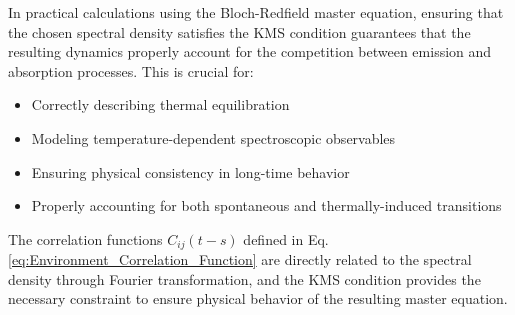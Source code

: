 \noindent In practical calculations using the Bloch-Redfield master equation, ensuring that the chosen spectral density satisfies the KMS condition guarantees that the resulting dynamics properly account for the competition between emission and absorption processes. This is crucial for:

\begin{itemize}
	\item Correctly describing thermal equilibration
	\item Modeling temperature-dependent spectroscopic observables
	\item Ensuring physical consistency in long-time behavior
	\item Properly accounting for both spontaneous and thermally-induced transitions
\end{itemize}

\noindent The correlation functions $C_{ij}(t-s)$ defined in Eq. \eqref{eq:Environment_Correlation_Function} are directly related to the spectral density through Fourier transformation, and the KMS condition provides the necessary constraint to ensure physical behavior of the resulting master equation.